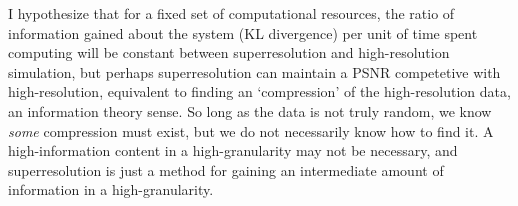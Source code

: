 I hypothesize that for a fixed set of computational resources, the ratio of information gained about the system (KL divergence) per unit of time spent computing will be constant between superresolution and high-resolution simulation, but perhaps superresolution can maintain a PSNR competetive with high-resolution, equivalent to finding an `compression' of the high-resolution data, an information theory sense. So long as the data is not truly random, we know \textit{some} compression must exist, but we do not necessarily know how to find it. A high-information content in a high-granularity may not be necessary, and superresolution is just a method for gaining an intermediate amount of information in a high-granularity.

